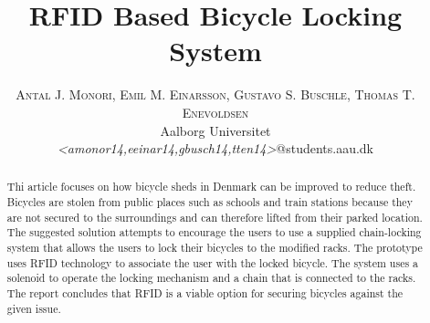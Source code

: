 \documentclass[twoside]{article}
\title{\vspace{-15mm}\fontsize{24pt}{10pt}\selectfont\textbf{RFID Based Bicycle Locking System}} %
\author{
\normalsize
\textsc{Antal J. Monori, Emil M. Einarsson, Gustavo S. Buschle, Thomas T. Enevoldsen} \\[2mm] %
\normalsize Aalborg Universitet \\ %
\normalsize \textit{<amonor14,eeinar14,gbusch14,tten14>}@students.aau.dk %
\vspace{-5mm}
}
\date{}
\begin{document}
\maketitle %

\thispagestyle{fancy} %


\begin{abstract}

\noindent Thi article focuses on how bicycle sheds in Denmark can be improved to reduce theft. Bicycles are stolen from public places such as schools and train stations because they are not secured to the surroundings and can therefore lifted from their parked location. The suggested solution attempts to encourage the users to use a supplied chain-locking system that allows the users to lock their bicycles to the modified racks. The prototype uses RFID technology to associate the user with the locked bicycle. The system uses a solenoid to operate the locking mechanism and a chain that is connected to the racks. The report concludes that RFID is a viable option for securing bicycles against the given issue.

\end{abstract}

\end{document}
